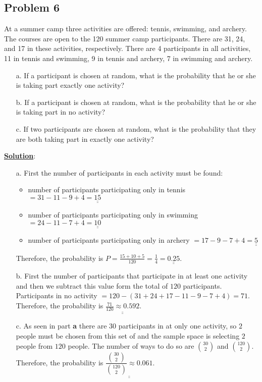 \documentclass[11pt,letter paper]{report}
\begin{document}
\subsection*{Problem 6}
At a summer camp three activities are offered: tennis, swimming, and archery. The courses are open to the 120 summer camp participants. There are 31, 24, and 17 in these activities, respectively. There are 4 participants in all activities, 11 in tennis and swimming, 9 in tennis and archery, 7 in swimming and archery. 
\begin{itemize}
\item[a.] If a participant is chosen at random, what is the probability that he or she is taking part exactly one activity?
\item[b.] If a participant is chosen at random, what is the probability that he or she is taking part in no activity?
\item[c.] If two participants are chosen at random, what is the probability that they are both taking part in exactly one activity?
\end{itemize}
{\bf \underline{Solution}}:
\begin{itemize}
\item[a.] First the number of participants in each activity must be found:
\begin{itemize}
\item number of participants participating only in tennis $=31-11-9+4=\underline{\underline{15}}$ 
\item number of participants participating only in swimming $=24-11-7+4=\underline{\underline{10}}$ 
\item number of participants participating only in archery $=17-9-7+4=\underline{\underline{5}}$ 
\end{itemize}
Therefore, the probability is $P=\frac{15+10+5}{120}=\frac{1}{4}=\underline{\underline{0.25}}$.
\item[b.] First the number of participants that participate in at least one activity and then we subtract this value form the total of $120$ participants. Participants in no activity $=120-(31+24+17-11-9-7+4)=71$. Therefore, the probability is $\underline{\underline{\frac{71}{120}\approx0.592}}$. 
\item[c.] As seen in part {\bf a} there are $30$ participants in at only one activity, so $2$ people must be chosen from this set of and the sample space is selecting $2$ people from $120$ people. The number of ways to do so are $\binom{30}{2}$ and $\binom{120}{2}$. Therefore, the probability is $\underline{\underline{\dfrac{\binom{30}{2}}{\binom{120}{2}}\approx0.061}}$.
\end{itemize}
\end{document}

